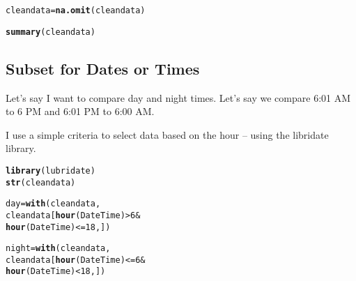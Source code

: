 \documentclass{article}\usepackage[]{graphicx}\usepackage[]{xcolor}
\makeatletter
\newcommand{\hlnum}[1]{\textcolor[rgb]{0.686,0.059,0.569}{#1}}%
\newcommand{\hlopt}[1]{\textcolor[rgb]{0,0,0}{#1}}%
\newcommand{\hlstd}[1]{\textcolor[rgb]{0.345,0.345,0.345}{#1}}%
\newcommand{\hlkwb}[1]{\textcolor[rgb]{0.69,0.353,0.396}{#1}}%
\newcommand{\hlkwd}[1]{\textcolor[rgb]{0.737,0.353,0.396}{\textbf{#1}}}%
\newenvironment{kframe}{%
 \def\at@end@of@kframe{}%
 \ifinner\ifhmode%
  \def\at@end@of@kframe{\end{minipage}}%
  \begin{minipage}{\columnwidth}%
 \fi\fi%
 \def\FrameCommand##1{\hskip\@totalleftmargin \hskip-\fboxsep
 \colorbox{shadecolor}{##1}\hskip-\fboxsep
     \hskip-\linewidth \hskip-\@totalleftmargin \hskip\columnwidth}%
 \MakeFramed {\advance\hsize-\width
   \@totalleftmargin\z@ \linewidth\hsize
   \@setminipage}}%
 {\par\unskip\endMakeFramed%
 \at@end@of@kframe}
\newenvironment{knitrout}{}{} %
\makeatother
\begin{document}
\begin{knitrout}
\color{fgcolor}\begin{kframe}
\begin{alltt}
\hlstd{cleandata} \hlkwb{=} \hlkwd{na.omit}\hlstd{(cleandata)}
\end{alltt}


{\ttfamily\noindent\bfseries\color{errorcolor}{\#\# Error in na.omit(cleandata): object 'cleandata' not found}}\begin{alltt}
\hlkwd{summary}\hlstd{(cleandata)}
\end{alltt}


{\ttfamily\noindent\bfseries\color{errorcolor}{\#\# Error in summary(cleandata): object 'cleandata' not found}}\end{kframe}
\end{knitrout}

\subsection{Subset for Dates or Times}

Let's say I want to compare day and night times. Let's say we compare 6:01 AM to 6 PM and 6:01 PM to 6:00 AM. 

I use a simple criteria to select data based on the hour -- using the libridate library.
\begin{knitrout}
\color{fgcolor}\begin{kframe}
\begin{alltt}
\hlkwd{library}\hlstd{(lubridate)}
\hlkwd{str}\hlstd{(cleandata)}
\end{alltt}


{\ttfamily\noindent\bfseries\color{errorcolor}{\#\# Error in str(cleandata): object 'cleandata' not found}}\begin{alltt}
\hlstd{day} \hlkwb{=} \hlkwd{with}\hlstd{(cleandata,}
     \hlstd{cleandata[}\hlkwd{hour}\hlstd{(DateTime)}\hlopt{>} \hlnum{6} \hlopt{&}
               \hlkwd{hour}\hlstd{(DateTime)}\hlopt{<=} \hlnum{18}\hlstd{,])}
\end{alltt}


{\ttfamily\noindent\bfseries\color{errorcolor}{\#\# Error in with(cleandata, cleandata[hour(DateTime) > 6 \& hour(DateTime) <= : object 'cleandata' not found}}\begin{alltt}
\hlstd{night} \hlkwb{=} \hlkwd{with}\hlstd{(cleandata,}
     \hlstd{cleandata[}\hlkwd{hour}\hlstd{(DateTime)}\hlopt{<=} \hlnum{6} \hlopt{&}
               \hlkwd{hour}\hlstd{(DateTime)}\hlopt{<} \hlnum{18}\hlstd{,])}
\end{alltt}


{\ttfamily\noindent\bfseries\color{errorcolor}{\#\# Error in with(cleandata, cleandata[hour(DateTime) <= 6 \& hour(DateTime) < : object 'cleandata' not found}}\end{kframe}
\end{knitrout}
\end{document}

